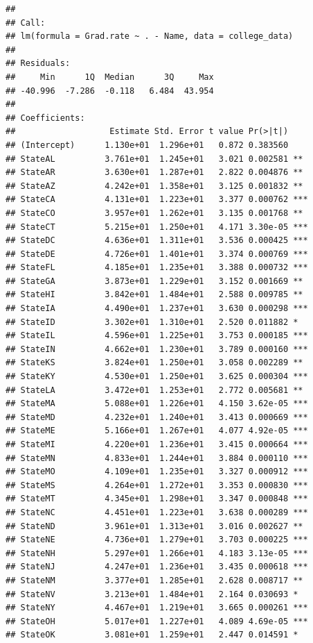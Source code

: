 \documentclass[]{article}
\begin{document}
\begin{verbatim}
## 
## Call:
## lm(formula = Grad.rate ~ . - Name, data = college_data)
## 
## Residuals:
##     Min      1Q  Median      3Q     Max 
## -40.996  -7.286  -0.118   6.484  43.954 
## 
## Coefficients:
##                   Estimate Std. Error t value Pr(>|t|)    
## (Intercept)      1.130e+01  1.296e+01   0.872 0.383560    
## StateAL          3.761e+01  1.245e+01   3.021 0.002581 ** 
## StateAR          3.630e+01  1.287e+01   2.822 0.004876 ** 
## StateAZ          4.242e+01  1.358e+01   3.125 0.001832 ** 
## StateCA          4.131e+01  1.223e+01   3.377 0.000762 ***
## StateCO          3.957e+01  1.262e+01   3.135 0.001768 ** 
## StateCT          5.215e+01  1.250e+01   4.171 3.30e-05 ***
## StateDC          4.636e+01  1.311e+01   3.536 0.000425 ***
## StateDE          4.726e+01  1.401e+01   3.374 0.000769 ***
## StateFL          4.185e+01  1.235e+01   3.388 0.000732 ***
## StateGA          3.873e+01  1.229e+01   3.152 0.001669 ** 
## StateHI          3.842e+01  1.484e+01   2.588 0.009785 ** 
## StateIA          4.490e+01  1.237e+01   3.630 0.000298 ***
## StateID          3.302e+01  1.310e+01   2.520 0.011882 *  
## StateIL          4.596e+01  1.225e+01   3.753 0.000185 ***
## StateIN          4.662e+01  1.230e+01   3.789 0.000160 ***
## StateKS          3.824e+01  1.250e+01   3.058 0.002289 ** 
## StateKY          4.530e+01  1.250e+01   3.625 0.000304 ***
## StateLA          3.472e+01  1.253e+01   2.772 0.005681 ** 
## StateMA          5.088e+01  1.226e+01   4.150 3.62e-05 ***
## StateMD          4.232e+01  1.240e+01   3.413 0.000669 ***
## StateME          5.166e+01  1.267e+01   4.077 4.92e-05 ***
## StateMI          4.220e+01  1.236e+01   3.415 0.000664 ***
## StateMN          4.833e+01  1.244e+01   3.884 0.000110 ***
## StateMO          4.109e+01  1.235e+01   3.327 0.000912 ***
## StateMS          4.264e+01  1.272e+01   3.353 0.000830 ***
## StateMT          4.345e+01  1.298e+01   3.347 0.000848 ***
## StateNC          4.451e+01  1.223e+01   3.638 0.000289 ***
## StateND          3.961e+01  1.313e+01   3.016 0.002627 ** 
## StateNE          4.736e+01  1.279e+01   3.703 0.000225 ***
## StateNH          5.297e+01  1.266e+01   4.183 3.13e-05 ***
## StateNJ          4.247e+01  1.236e+01   3.435 0.000618 ***
## StateNM          3.377e+01  1.285e+01   2.628 0.008717 ** 
## StateNV          3.213e+01  1.484e+01   2.164 0.030693 *  
## StateNY          4.467e+01  1.219e+01   3.665 0.000261 ***
## StateOH          5.017e+01  1.227e+01   4.089 4.69e-05 ***
## StateOK          3.081e+01  1.259e+01   2.447 0.014591 *  

\end{verbatim}
\end{document}
